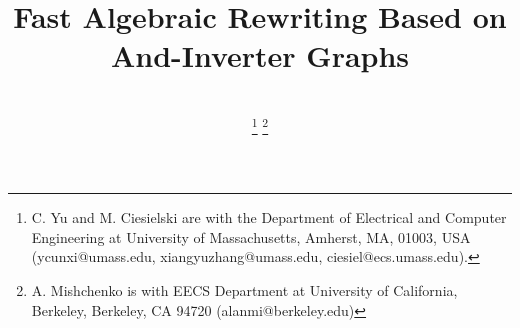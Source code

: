 \documentclass[journal]{IEEEtran}
\begin{document}

\title{Fast Algebraic Rewriting Based on And-Inverter Graphs}


%
%

\author{\\
\thanks{C. Yu and M. Ciesielski are with the Department of Electrical and Computer Engineering at University of Massachusetts, Amherst, MA, 01003, USA (ycunxi@umass.edu, xiangyuzhang@umass.edu, ciesiel@ecs.umass.edu).}
\thanks{A. Mishchenko is with EECS Department at University of California, Berkeley, Berkeley, CA 94720 (alanmi@berkeley.edu)}
}



%
%


\maketitle
\end{document}
